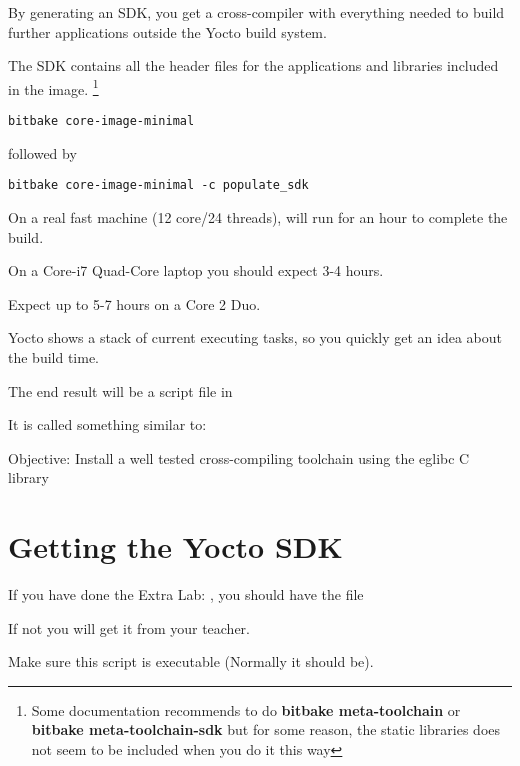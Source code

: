 By generating an SDK, you get a cross-compiler with everything needed to build 
further applications outside the Yocto build system.

The SDK contains all the header files for the applications and libraries included in the image. 
\footnote{Some documentation recommends to do {\bf bitbake meta-toolchain} or {\bf bitbake meta-toolchain-sdk}
but for some reason, the static libraries does not seem to be included when you do it this way}

\begin{verbatim}
bitbake core-image-minimal
\end{verbatim}

followed by

\begin{verbatim}
bitbake core-image-minimal -c populate_sdk
\end{verbatim}

On a real fast machine (12 core/24 threads),
 will run for an hour to complete the build.

On a Core-i7 Quad-Core laptop you should expect 3-4 hours.

Expect up to 5-7 hours on a Core 2 Duo.

Yocto shows a stack of current executing tasks,
so you quickly get an idea about the build time.
 
The end result will be a script file in 

It is called something similar to:


  {Objective: Install a well tested cross-compiling toolchain using the eglibc C
  library}

\section{Getting the Yocto SDK}

If you have done the Extra Lab: , 
you should have the file


If not you will get it from your teacher.

Make sure this script is executable (Normally it should be).

